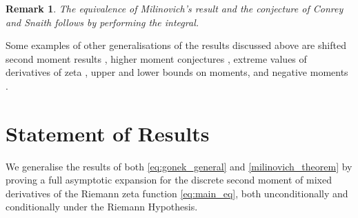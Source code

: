 \documentclass[12pt, a4paper,reqno]{amsart}
\newtheorem*{remark*}{Remark}
\theoremstyle{definition}
\numberwithin{equation}{section}
\begin{document}
\begin{remark*}
    The equivalence of Milinovich's result and the conjecture of Conrey and Snaith follows by performing the integral.
\end{remark*}

Some examples of other generalisations of the results discussed above are shifted second moment results \cite{garunkvstis2025mean, garunks_novikas}, higher moment conjectures \cite{gonek1989negative, Hejhal1989, hughes2000, ng2004}, extreme values of derivatives of zeta \cite{ng2008}, upper and lower bounds \cite{kirila2020, benli2023} on moments, and negative moments \cite{gonek1989negative, garaev2003, heap20222, gao2023, bui2024}.


\section{Statement of Results}

We generalise the results of both \eqref{eq:gonek_general} and \eqref{milinovich_theorem} by proving a full asymptotic expansion for the discrete second moment of mixed derivatives of the Riemann zeta function \eqref{eq:main_eq}, both unconditionally and conditionally under the Riemann Hypothesis.
\end{document}
